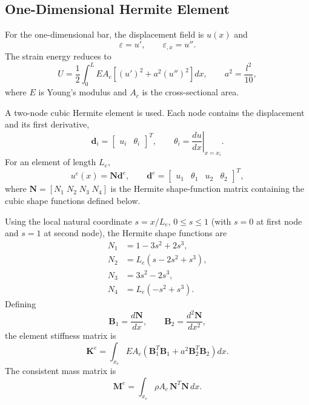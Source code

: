 \documentclass[final,3p,times,fleqn]{elsarticle}
\begin{document}
\subsection{One-Dimensional Hermite Element}
\label{subsec:one_dimensional_hermite_element}

For the one-dimensional bar, the displacement field is $u(x)$ and
\begin{equation}
\label{eq:1d_strain_gradient}
\varepsilon=u',
\qquad
\varepsilon_{,x}=u'' .
\end{equation}
The strain energy reduces to
\begin{equation}
\label{eq:1d_fem_energy}
U
=
\frac{1}{2}
\int_0^L
EA_c\left[(u')^2+a^2(u'')^2\right]dx,
\qquad
a^2=\frac{l^2}{10},
\end{equation}
where $E$ is Young's modulus and $A_c$ is the cross-sectional area.

A two-node cubic Hermite element is used. Each node contains the
displacement and its first derivative,
\begin{equation}
\label{eq:1d_dofs}
\mathbf{d}_i
=
\begin{bmatrix}
u_i & \theta_i
\end{bmatrix}^{T},
\qquad
\theta_i
=
\left.\frac{du}{dx}\right|_{x=x_i}.
\end{equation}
For an element of length $L_e$,
\begin{equation}
\label{eq:1d_hermite_interpolation}
u^e(x)
=
\mathbf{N}\mathbf{d}^e,
\qquad
\mathbf{d}^e
=
\begin{bmatrix}
u_1 & \theta_1 & u_2 & \theta_2
\end{bmatrix}^{T},
\end{equation}
where $\mathbf{N}=[N_1\; N_2\; N_3\; N_4]$ is the Hermite shape-function matrix containing the cubic shape functions defined below.

Using the local natural coordinate $s=x/L_e$, $0\leq s\leq1$ (with $s=0$ at first node and $s=1$ at second node), the Hermite shape
functions are
\begin{align}
N_1 &= 1-3s^2+2s^3, \label{eq:1d_H_N1}\\
N_2 &= L_e(s-2s^2+s^3), \label{eq:1d_H_N2}\\
N_3 &= 3s^2-2s^3, \label{eq:1d_H_N3}\\
N_4 &= L_e(-s^2+s^3). \label{eq:1d_H_N4}
\end{align}
Defining
\begin{equation}
\label{eq:1d_B_matrices}
\mathbf{B}_1
=
\frac{d\mathbf{N}}{dx},
\qquad
\mathbf{B}_2
=
\frac{d^2\mathbf{N}}{dx^2},
\end{equation}
the element stiffness matrix is
\begin{equation}
\label{eq:1d_element_stiffness}
\mathbf{K}^{e}
=
\int_{x_e}
EA_c
\left(
\mathbf{B}_1^T\mathbf{B}_1
+
a^2\mathbf{B}_2^T\mathbf{B}_2
\right)dx .
\end{equation}
The consistent mass matrix is
\begin{equation}
\label{eq:1d_element_mass}
\mathbf{M}^{e}
=
\int_{x_e}
\rho A_c\,\mathbf{N}^T\mathbf{N}\,dx .
\end{equation}
\end{document}
